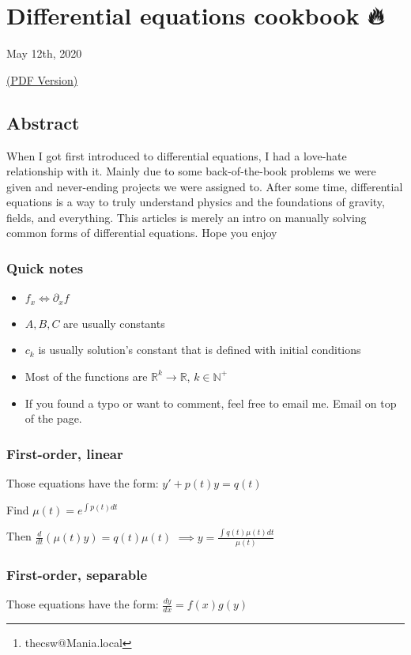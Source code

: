 \documentclass[12pt]{article}
\author{Sandy Urazayev\thanks{thecsw@Mania.local}}
\date{\today}
\title{}
\begin{document}
\section*{Differential equations cookbook 🔥}
\label{sec:orgaaf4ef9}

May 12th, 2020

\href{./index.pdf}{(PDF Version)}

\subsection*{Abstract}
\label{sec:org68f3f8b}
When I got first introduced to differential equations, I had a love-hate
relationship with it. Mainly due to some back-of-the-book problems we were given
and never-ending projects we were assigned to. After some time, differential
equations is a way to truly understand physics and the foundations of gravity,
fields, and everything. This articles is merely an intro on manually solving
common forms of differential equations. Hope you enjoy

\subsubsection*{Quick notes}
\label{sec:org3dfe43d}
\begin{itemize}
\item \(f_x \iff \partial_x f\)
\item \(A,B,C\) are usually constants
\item \(c_k\) is usually solution's constant that is defined with initial conditions
\item Most of the functions are \(\mathbb{R}^k \to \mathbb{R}\), \(k \in \mathbb{N}^+\)
\item If you found a typo or want to comment, feel free to email me. Email on
top of the page.
\end{itemize}

\subsubsection*{First-order, linear}
\label{sec:orgf77f35f}
Those equations have the form: \(y' + p(t) y = q(t)\)

Find \(\mu(t) = e^{\int p(t) dt}\)

Then \(\frac{d}{dt}(\mu(t)y) = q(t) \mu(t)\)
\(\implies y = \frac{\int q(t) \mu(t) dt}{\mu(t)}\)

\subsubsection*{First-order, separable}
\label{sec:org5f690e5}
Those equations have the form: \(\frac{dy}{dx} = f(x)g(y)\)
\end{document}
